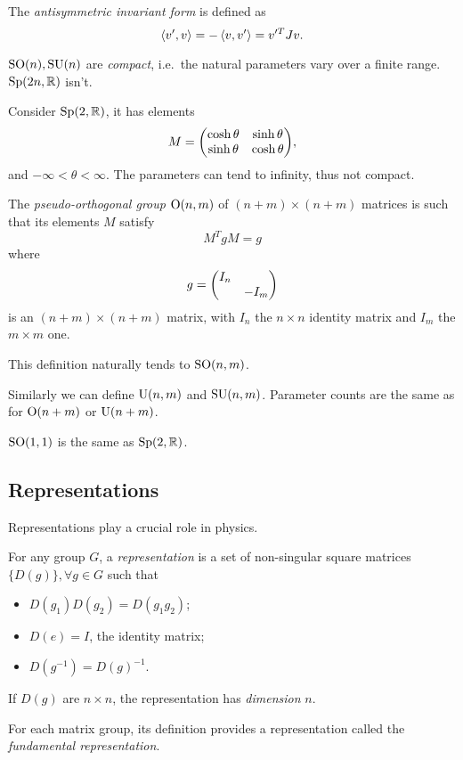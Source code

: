 \documentclass[a4paper,11pt]{article}
\begin{document}
	\begin{defi}
		The \emph{antisymmetric invariant form} is defined as
		\[
			\expval{v',v} = -\expval{v,v'} = v'^T J v.
		\]
	\end{defi}
	
	\begin{prop}
		$\operatorname{SO}(n), \operatorname{SU}(n)$ are \emph{compact}, i.e.\ the natural parameters vary over a finite range. $\operatorname{Sp}(2n,\mathbb{R})$ isn't.
	\end{prop}

	\begin{ex}
		Consider $\operatorname{Sp}(2,\mathbb{R})$, it has elements
		\[
			M = \mqty(\cosh \theta & \sinh \theta\\ \sinh \theta & \cosh \theta),
		\]
		and $-\infty < \theta < \infty$. The parameters can tend to infinity, thus not compact.
	\end{ex}

	\begin{defi}
		The \emph{pseudo-orthogonal group} $\operatorname{O}(n,m)$ of $(n + m)\times (n+m)$ matrices is such that its elements $M$ satisfy
		\[
			M^T g M = g
		\]
		where
		\[
			g = \mqty(\dmat{I_n, - I_m})
		\]
		is an $(n+m)\times (n+m)$ matrix, with $I_n$ the $n\times n$ identity matrix and $I_m$ the $m\times m$ one.

		This definition naturally tends to $\operatorname{SO}(n,m)$.
	\end{defi}

	Similarly we can define $\operatorname{U}(n,m)$ and $\operatorname{SU}(n,m)$. Parameter counts are the same as for $\operatorname{O}(n+m)$ or $\operatorname{U}(n+m)$.

	\begin{nt}
		$\operatorname{SO}(1,1)$ is the same as $\operatorname{Sp}(2,\mathbb{R})$.
	\end{nt}

	\subsection{Representations}

	Representations play a crucial role in physics.

	\begin{defi}
		For any group $G$, a \emph{representation} is a set of non-singular square matrices $\{D(g)\}, \forall g\in G$ such that
		\begin{itemize}
			\item $D(g_1) D(g_2) = D(g_1 g_2)$;
			\item $D(e) = I$, the identity matrix;
			\item $D(g^{-1}) = D(g)^{-1}$. 
		\end{itemize}
		
		If $D(g)$ are $n\times n$, the representation has \emph{dimension} $n$.

		For each matrix group, its definition provides a representation called the \emph{fundamental representation}.
	\end{defi}
\end{document}
